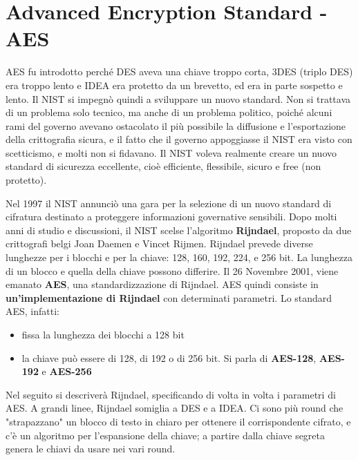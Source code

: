 \section{Advanced Encryption Standard - AES}
AES fu introdotto perché DES aveva una chiave troppo corta, 3DES (triplo DES) era troppo lento e IDEA era protetto da un brevetto, ed era in parte sospetto e lento. Il NIST si impegnò quindi a sviluppare un nuovo standard. Non si trattava di un problema solo tecnico, ma anche di un problema politico, poiché alcuni rami del governo avevano ostacolato il più possibile la diffusione e l'esportazione della crittografia sicura, e il fatto che il governo appoggiasse il NIST era visto con scetticismo, e molti non si fidavano. Il NIST voleva realmente creare un nuovo standard di sicurezza eccellente, cioè efficiente, flessibile, sicuro e free (non protetto).

Nel 1997 il NIST annunciò una gara per la selezione di un nuovo standard di cifratura destinato a proteggere informazioni governative sensibili. Dopo molti anni di studio e discussioni, il NIST scelse l'algoritmo \textbf{Rijndael}, proposto da due crittografi belgi Joan Daemen e Vincet Rijmen. Rijndael prevede diverse lunghezze per i blocchi e
per la chiave: 128, 160, 192, 224, e 256 bit. La lunghezza di un blocco e quella della chiave possono differire. Il 26 Novembre 2001, viene emanato \textbf{AES}, una standardizzazione di Rijndael. AES quindi consiste in \textbf{un'implementazione di Rijndael} con determinati parametri. Lo standard AES, infatti:
\begin{itemize}
  \item fissa la lunghezza dei blocchi a 128 bit
  \item la chiave può essere di 128, di 192 o di 256 bit. Si parla di \textbf{AES-128}, \textbf{AES-192} e \textbf{AES-256}
\end{itemize}

Nel seguito si descriverà Rijndael, specificando di volta in volta i parametri di AES. A grandi linee, Rijndael somiglia a DES e a IDEA. Ci sono più round che "strapazzano" un blocco di testo in chiaro per ottenere il corrispondente cifrato, e c'è un algoritmo per l'espansione della chiave; a partire dalla chiave segreta genera le chiavi da usare nei vari round.

